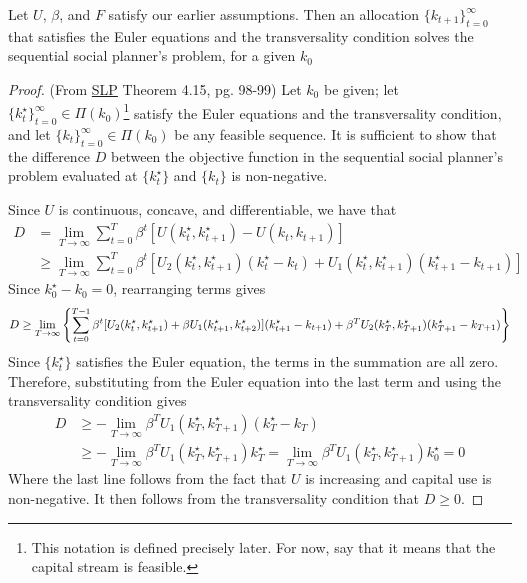\documentclass[10pt]{article}
\begin{document}
\begin{example}
\begin{enumerate}
		\begin{theorem}\label{thm:suff_euler_tc} 
			Let $U$, $\beta$, and $F$ satisfy our earlier assumptions. Then an allocation $\{k_{t+1}\}_{t=0}^\infty$ that satisfies the Euler equations and the transversality condition solves the sequential social planner's problem, for a given $k_0$
		\end{theorem}
		\begin{proof}
			(From \href{https://www.hup.harvard.edu/books/9780674750968}{SLP} Theorem 4.15, pg. 98-99) Let $k_0$ be given; let $\{k_t^\star\}_{t=0}^\infty \in \Pi(k_0)$\footnote{This notation is defined precisely later. For now, say that it means that the capital stream is feasible.} satisfy the Euler equations and the transversality condition, and let $\{k_t\}_{t=0}^\infty \in \Pi(k_0)$ be any feasible sequence. It is sufficient to show that the difference $D$ between the objective function in the sequential social planner's problem evaluated at $\{k_t^\star\}$ and $\{k_t\}$ is non-negative. 
			
			Since $U$ is continuous, concave, and differentiable, we have that
			\begin{align*}
				D &= \lim_{T \to \infty} \sum_{t=0}^T \beta^t [U(k_t^\star,k_{t+1}^\star) - U(k_t,k_{t+1})] \\
				&\ge \lim_{T \to \infty} \sum_{t=0}^T \beta^t [U_2(k_t^\star,k_{t+1}^\star)(k_t^\star - k_t) +  U_1(k_{t}^\star,k_{t+1}^\star)(k_{t+1}^\star - k_{t+1})]
			\end{align*}
			Since $k^\star_0 - k_0 = 0$, rearranging terms gives
			\[
			D \ge \lim_{T\to\infty} \left\{ \sum_{t=0}^{T-1} \beta^t[U_2(k_t^\star,k_{t+1}^\star) + \beta U_1(k_{t+1}^\star,k_{t+2}^\star)] (k^\star_{t+1} - k_{t+1}) + \beta^T U_2(k_T^\star,k_{T+1}^\star)(k^\star_{T+1} - k_{T+1}) \right\}
			\]
			Since $\{k_t^\star\}$ satisfies the Euler equation, the terms in the summation are all zero. Therefore, substituting from the Euler equation into the last term and using the transversality condition gives
			\begin{align*}
				D &\ge -\lim_{T\to\infty} \beta^T U_1(k_T^\star,k_{T+1}^\star) (k_T^\star - k_T) \\
				&\ge -\lim_{T\to\infty} \beta^T U_1(k_T^\star,k_{T+1}^\star) k_T^\star = \lim_{T\to\infty} \beta^T U_1(k_T^\star,k_{T+1}^\star) k_0^\star = 0
			\end{align*}
			Where the last line follows from the fact that $U$ is increasing and capital use is non-negative. It then follows from the transversality condition that $D \ge 0$.
		\end{proof}
		

\end{enumerate}
\end{example}
\end{document}
